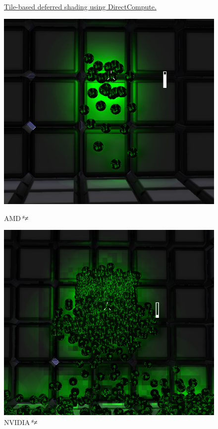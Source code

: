 \begin{frame}
\begin{figure}[ht]
\begin{minipage}[b]{0.3\linewidth}
  \end{minipage}
  \label{fig:tilingvisualization}
  \caption{\href{https://github.com/L0mion/xkill-source}{%
      Tile-based deferred shading using DirectCompute.}}
\end{figure}

\begin{figure}[ht]
  \begin{minipage}[b]{0.3\linewidth}
    \centering
    \includegraphics[width=1.0\textwidth]{img/tbds.png}
    \caption{AMD\textit{*≠}}
  \end{minipage}
  \hspace{0.25cm}
  \begin{minipage}[b]{0.3\linewidth}
    \centering
    \includegraphics[width=1.0\textwidth]{img/tbds_error.png}
    \caption{NVIDIA\textit{*≠}}
  \end{minipage}
  \label{fig:tilingerror}
\end{figure}

\end{frame}

